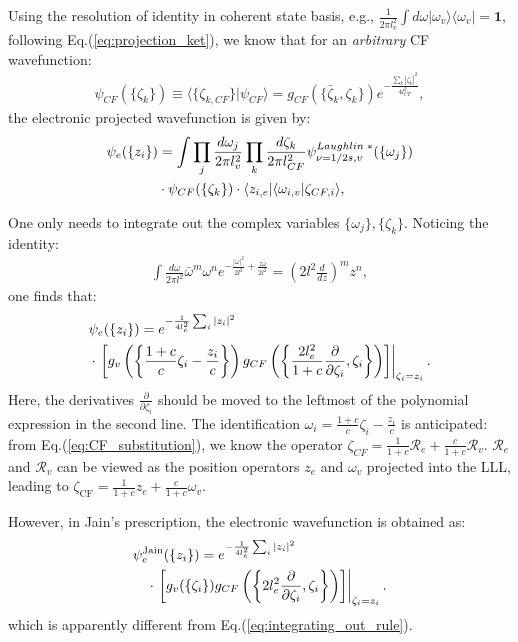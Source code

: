 Using the resolution of identity in coherent state basis, e.g., $\frac{1}{2\pi l_v^2}\int d\omega |\omega_v\rangle\langle\omega_v|=\mathbf 1$, following Eq.(\ref{eq:projection_ket}), we know that for an \emph{arbitrary} CF wavefunction:
\begin{align}
\psi_{CF}(\{\zeta_k\})\equiv\langle \{\zeta_{k,CF}\}|\psi_{CF}\rangle=g_{CF}(\{\bar\zeta_k,\zeta_k\})e^{-\frac{\sum_k|\zeta_k|^2}{4l_{CF}^2}},
\end{align}
the electronic projected wavefunction is given by:
\begin{align}
\psi_e(\{z_i\})&=\int \prod_j \frac{d\omega_j}{2\pi l_v^2} \prod_k \frac{d\zeta_k}{2\pi l_{CF}^2} \psi^{Laughlin \;*}_{\nu=1/2s,v}(\{\omega_j\})\notag\\
&\cdot {\psi}_{CF}(\{\zeta_k\})\cdot\langle z_{i,e}|\langle\omega_{i,v}|\zeta_{CF,i}\rangle,
\end{align}

One only needs to integrate out the complex variables $\{\omega_j\},\{\zeta_k\}$. Noticing the identity:
\begin{align}
\int \frac{d\omega}{2\pi l^2} \bar\omega^m \omega^n  e^{-\frac{|\omega|^2}{2l^2}+\frac{z\bar\omega}{2l^2}}=\left(2l^2\frac{d}{dz}\right)^m z^n,
\end{align}
one finds that:
\begin{align}
&\psi_e(\{z_i\})=e^{-\frac{1}{4l_e^2}\sum_i |z_i|^2}\notag\\
&\cdot \left.\left[g_v\left(\left\{\frac{1+c}{c}\zeta_i-\frac{z_i}{c}\right\}\right)g_{CF}\left(\left\{\frac{2l_e^2}{1+c}\frac{\partial}{\partial \zeta_i}, \zeta_i\right\}\right)\right]\right|_{\zeta_i=z_i}.\label{eq:integrating_out_rule}
\end{align}
Here, the derivatives $\frac{\partial}{\partial \zeta_i}$ should be moved to the leftmost of the polynomial expression in the second line. The identification $\omega_i=\frac{1+c}{c}\zeta_i-\frac{z_i}{c}$ is anticipated: from Eq.(\ref{eq:CF_substitution}), we know the operator $\zeta_{CF}=\frac{1}{1+c}\mathcal R_e+\frac{c}{1+c}\mathcal R_v$. $\mathcal R_e$ and $\mathcal R_v$ can be viewed as the position operators $z_e$ and $\omega_v$ projected into the LLL, leading to $\zeta_{\text{CF}}=\frac{1}{1+c} z_e +\frac{c}{1+c}\omega_v$.

However, in Jain's prescription, the electronic wavefunction is obtained as:
\begin{align}
&\psi^{\text{Jain}}_e(\{z_i\})=e^{-\frac{1}{4l_e^2}\sum_i |z_i|^2}\notag\\
&\quad\cdot \left.\left[g_v(\{\zeta_i\})g_{CF}\left(\left\{2l_e^2\frac{\partial}{\partial \zeta_i}, \zeta_i\right\}\right)\right]\right|_{\zeta_i=z_i}.\label{eq:integrating_out_rule_Jain}
\end{align}
which is apparently different from Eq.(\ref{eq:integrating_out_rule}). 


